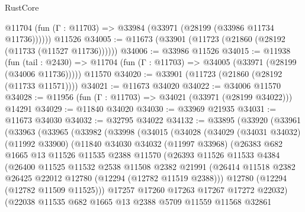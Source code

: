 \begin{lexlean}{RustCore}
\begin{coremodule}
      @11704 (fun (Γ : @11703) => @33984 (@33971 (@28199 (@33986 @11734 @11736))))))
    @11526
@34005 := @11673 (@33901 (@11723 (@21860 (@28192 (@11733 (@11527 @11736))))))
@34006 := @33986 @11526
@34015 := @11938
    (fun (tail : @2430) => @11704 (fun (Γ : @11703) => @34005 (@33971 (@28199 (@34006 @11736)))))
    @11570
@34020 := @33901 (@11723 (@21860 (@28192 (@11733 @11571))))
@34021 := @11673 @34020
@34022 := @34006 @11570
@34028 := @11956 (fun (Γ : @11703) => @34021 (@33971 (@28199 @34022))) @14291
@34029 := @11840 @34020
@34030 := @33969 @21935
@34031 := @11673 @34030
@34032 := @32795 @34022
@34132 := @33895
    (@33920
      (@33961
        (@33963
          (@33965
            (@33982
              (@33998
                (@34015
                  (@34028
                    (@34029
                      (@34031 @34032)
                      (@11992 @33900)
                      (@11840
                        @34030
                        @34032
                        (@11997 @33968)
                        (@26383
                          @682
                          @1665
                          @13
                          @11526
                          @11535
                          @2388
                          @11570
                          (@26393
                            @11526
                            @11533
                            @4384
                            (@26400
                              @11525
                              @11532
                              @2538
                              @11508
                              @2382
                              @21991
                              (@26414
                                @11518
                                @2382
                                @26425
                                @22012
                                @12780
                                (@12294 (@12782 @11519 @2388)))
                              @12780
                              (@12294 (@12782 @11509 @11525)))
                            @17257
                            @17260
                            @17263
                            @17267
                            @17272
                            @22032)
                          (@22038
                            @11535
                            @682
                            @1665
                            @13
                            @2388
                            @5709
                            @11559
                            @11568
                            @32861

\end{coremodule}
\end{lexlean}
